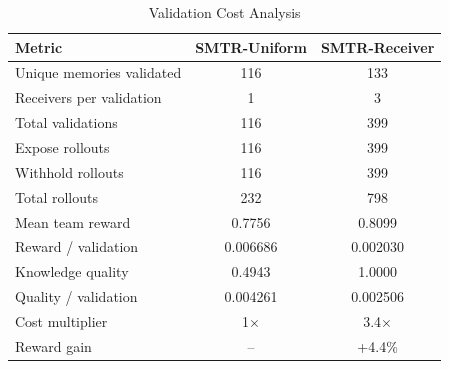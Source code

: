 \begin{table}[t]
\caption{Validation Cost Analysis}
\label{tab:receiver3_cost}
\centering
\begin{tabular}{l c c}
\toprule
Metric & SMTR-Uniform & SMTR-Receiver \\
\midrule
Unique memories validated & 116 & 133 \\
Receivers per validation & 1 & 3 \\
Total validations & 116 & 399 \\
Expose rollouts & 116 & 399 \\
Withhold rollouts & 116 & 399 \\
Total rollouts & 232 & 798 \\
Mean team reward & 0.7756 & 0.8099 \\
Reward / validation & 0.006686 & 0.002030 \\
Knowledge quality & 0.4943 & 1.0000 \\
Quality / validation & 0.004261 & 0.002506 \\
\midrule
Cost multiplier & 1$\times$ & 3.4$\times$ \\
Reward gain & -- & +4.4\% \\
\bottomrule
\end{tabular}
\end{table}